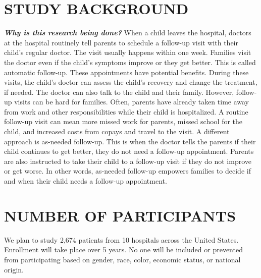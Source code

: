 \documentclass[11pt]{article}
\begin{document}
%
{%
\section{STUDY BACKGROUND}
\label{sec:background}
{  \textbf{\textit{Why is this research being done?}} 
When a child leaves the hospital, doctors at the hospital routinely tell parents to schedule a follow-up visit with their child's regular doctor.  The visit usually happens within one week. Families visit the doctor even if the child's symptoms improve or they get better. This is called automatic follow-up. These appointments have potential benefits.  During these visits, the child's doctor can assess the child's recovery and change the treatment, if needed. The doctor can also talk to the child and their family. 
However, follow-up visits can be hard for families. Often, parents have already taken time away from work and other responsibilities while their child is hospitalized. A routine follow-up visit can mean more missed work for parents, missed school for the child, and increased costs from copays and travel to the visit. 
A different approach is as-needed follow-up. This is when the doctor tells the parents if their child continues to get better, they do not need a follow-up appointment. Parents are also instructed to take their child to a follow-up visit if they do not improve or get worse. In other words, as-needed follow-up empowers families to decide if and when their child needs a follow-up appointment.
}
}%
{}%

%
{%
\section{NUMBER OF PARTICIPANTS}
\label{sec:numberofparticipants}
{We plan to study 2,674  patients from 10 hospitals across the United States. Enrollment will take place over 5 years. No one will be included or prevented from participating based on gender, race, color, economic status, or national origin.}
}%
{}%
\end{document}
